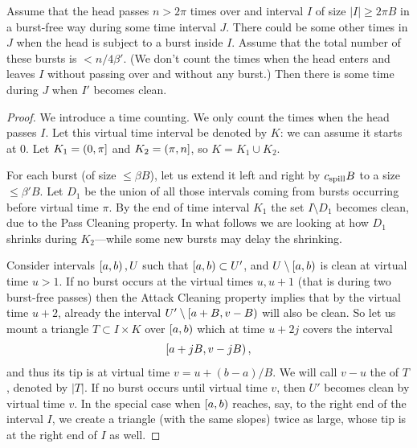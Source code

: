\documentclass[12pt]{memoir}
\renewcommand{\le}{\leq}
\renewcommand{\ge}{\geq}
\def\B{B}
\newcommand{\cns}[1]{c_{\textrm{\upshape #1}}}
\newcommand{\CSpill}{\cns{spill}}
\begin{document}
\begin{lemma}\label{lem:dirty-passes}
Assume that the head passes \( n> 2\pi \) times over and interval \( I \) of size \( |I|\ge 2\pi B \) 
in a burst-free way during some time interval \( J \).
There could be some other times in \( J \) when the head is subject to a burst inside \( I \).
Assume that the total number of these bursts is \( < n/4\beta' \).
(We don't count the times when the head enters and leaves \( I \) without
passing over and without any burst.)
Then there is some time during \( J \) when \( I' \) becomes clean.
\end{lemma}
\begin{proof}
We introduce a  time counting.
We only count the times when the head passes \( I \).
Let this virtual time interval be denoted by \( K \): we can assume it starts at 0.
Let \( K_{1}=(0,\pi] \) and \( K_{2}=(\pi,n] \), so \( K=K_{1}\cup K_{2} \).

For each burst (of size \( \le\beta\B \)), let us extend it left and right by \( \CSpill B \) 
to a size \( \le  \beta' B \).
Let \( D_{1} \) be the union of all those intervals coming from bursts occurring before virtual time \( \pi \).
By the end of time interval \( K_{1} \) the set \( I\setminus D_{1} \) 
becomes clean, due to the Pass Cleaning property.
In what follows we are looking at how \( D_{1} \) shrinks during \( K_{2} \)---while some new bursts may
delay the shrinking.

Consider intervals \( \left[a,b\right), U \) such that \( \left[a,b\right)\subset U' \),
and \( U\setminus \left[a,b\right) \) is clean at virtual time \( u>1 \).
If no burst occurs at the virtual times \( u,u+1 \) (that is during two burst-free passes) then 
the Attack Cleaning property implies that 
by the virtual time \( u+2 \), already the interval \( U'\setminus \lint{a+\B}{v-\B} \) will also be clean.
So let us mount a triangle \( T\subset I\times K \) over \( \left[a,b\right) \)
which at time \( u+2j \) covers the interval
 \begin{align*}
 \lint{a+j\B}{v-j\B},
 \end{align*}
and thus its tip is at virtual time \( v=u+(b-a)/\B \).
We will call \( v-u \) the  of \( T \), denoted by \( |T| \).
If no burst occurs until virtual time \( v \), then \( U' \) becomes clean
by virtual time \( v \).
In the special case when \( \left[a,b\right) \) reaches, say, to the right end of the interval \( I \),
we create a triangle (with the same slopes) 
twice as large, whose tip is at the right end of \( I \) as well.


\end{proof}
\end{document}
